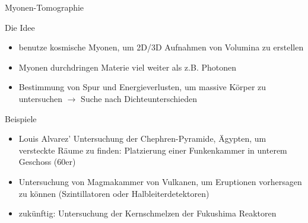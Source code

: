 

\begin{frame}{Myonen-Tomographie}

		\begin{block}{Die Idee}
			\begin{itemize}
			 	\item benutze kosmische Myonen, um 2D/3D Aufnahmen von Volumina zu erstellen
		  		\item Myonen durchdringen Materie viel weiter als z.B. Photonen
		  		\item Bestimmung von Spur und Energieverlusten, um massive Körper zu untersuchen
		  		$\rightarrow$ Suche nach Dichteunterschieden
			\end{itemize}
		\end{block}
		
		\begin{block}{Beispiele}
			\begin{itemize}
			 	\item Louis Alvarez' Untersuchung der Chephren-Pyramide, Ägypten, um versteckte Räume zu
			 	finden: Platzierung einer Funkenkammer in unterem Geschoss (60er)
			 	\item Untersuchung von Magmakammer von Vulkanen, um Eruptionen vorhersagen zu können
			 	(Szintillatoren oder Halbleiterdetektoren)
			 	\item zukünftig: Untersuchung der Kernschmelzen der Fukushima Reaktoren
			\end{itemize}
		\end{block}
\end{frame}

